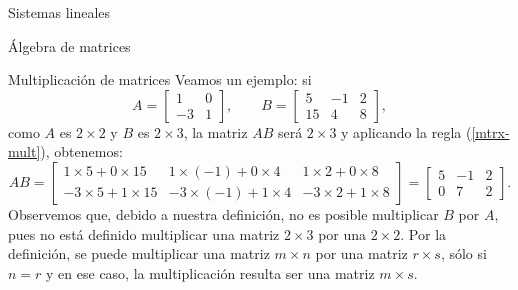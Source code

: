 \documentclass[a4paper,12pt,twoside,spanish]{amsbook}
\theoremstyle{definition}
\theoremstyle{remark}
\begin{document}
\begin{chapter}{Sistemas lineales}
\begin{section}{Álgebra de matrices}
\begin{subsection}{Multiplicación de matrices}
				Veamos un ejemplo: si 
				\begin{equation*}
				A = \begin{bmatrix}1&0\\-3&1\end{bmatrix}, \qquad B = \begin{bmatrix}5&-1&2\\15&4&8\end{bmatrix},
				\end{equation*}
				como $A$ es $2 \times 2$ y $B$ es $2 \times 3$, la matriz $AB$ será $2 \times 3$ y  aplicando la regla (\ref{mtrx-mult}), obtenemos:
				\begin{equation*}
				AB = \begin{bmatrix}1\times  5 + 0\times 15&1\times (-1) + 0\times 4&1\times 2 + 0\times 8
				\\-3\times 5 + 1\times 15&-3\times (-1) + 1\times 4&-3\times 2 + 1\times 8
				\end{bmatrix} =
				\begin{bmatrix} 5 &-1 &2 
				\\ 0 &7 &2
				\end{bmatrix}.
				\end{equation*}
				Observemos que, debido a nuestra definición, no es posible multiplicar $B$ por $A$, pues no está definido multiplicar una matriz $2 \times 3$ por una $2 \times 2$. Por la definición, se puede multiplicar una matriz $m \times n$ por una matriz $r \times s$, sólo si $n=r$ y en ese caso, la multiplicación resulta ser una matriz $m \times s$. 	
				

\end{subsection}
\end{section}
\end{chapter}
\end{document}
